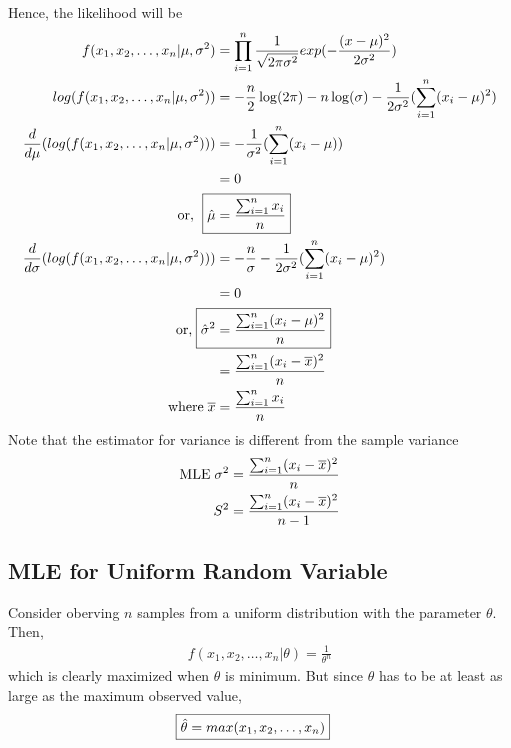 \documentclass[../probability-notes.tex]{subfiles}
\begin{document}
    Hence, the likelihood will be
    \begin{align*}
        f(x_{1}, x_{2}, \ldots, x_{n}|\mu, \sigma^{2}) &= \prod_{i=1}^{n} \frac{1}{\sqrt{2 \pi \sigma^{2}}} exp(-\frac{(x-\mu)^{2}}{2\sigma^{2}})\\
        log(f(x_{1}, x_{2}, \ldots, x_{n}|\mu, \sigma^{2})) &= -\frac{n}{2}\log(2\pi) - n\log(\sigma) - \frac{1}{2\sigma^{2}}(\sum_{i=1}^{n} (x_{i} - \mu)^{2})\\
        \frac{d}{d\mu}(log(f(x_{1}, x_{2}, \ldots, x_{n}|\mu, \sigma^{2}))) &= -\frac{1}{\sigma^{2}}(\sum_{i=1}^{n} (x_{i} - \mu))\\
        &= 0\\
        \text{or, \;} \Aboxed{\hat{\mu} &= \frac{\sum_{i=1}^{n} x_{i}}{n}}\\
        \frac{d}{d\sigma}(log(f(x_{1}, x_{2}, \ldots, x_{n}|\mu, \sigma^{2}))) &= - \frac{n}{\sigma} - \frac{1}{2\sigma^{2}}(\sum_{i=1}^{n} (x_{i} - \mu)^{2})\\
        &= 0\\
        \text{or,\;} \Aboxed{\hat{\sigma}^{2} &= \frac{\sum_{i=1}^{n}(x_{i} - \mu)^2}{n}}\\
        &= \frac{\sum_{i=1}^{n}(x_{i} - \overline{x})^2}{n}\\
        \text{where\;} \overline{x} &= \frac{\sum_{i=1}^{n} x_{i}}{n}
    \end{align*}
    Note that the estimator for variance is different from the sample variance
    \begin{align*}
        \text{MLE\;} \sigma^{2} &= \frac{\sum_{i=1}^{n}(x_{i} - \overline{x})^2}{n}\\
        S^{2} &= \frac{\sum_{i=1}^{n}(x_{i} - \overline{x})^2}{n - 1}
    \end{align*}


    \subsection{MLE for Uniform Random Variable}
    Consider oberving $n$ samples from a uniform distribution with the parameter $\theta$. Then,
    \begin{align*}
        f(x_{1}, x_{2}, \ldots, x_{n}|\theta) = \frac{1}{\theta^{n}}
    \end{align*}
    which is clearly maximized when $\theta$ is minimum. But since $\theta$ has to be at least as large as the maximum observed value,
    \begin{align*}
        \Aboxed{\hat{\theta} = max(x_{1}, x_{2}, \ldots, x_{n})}
    \end{align*}
\end{document}
